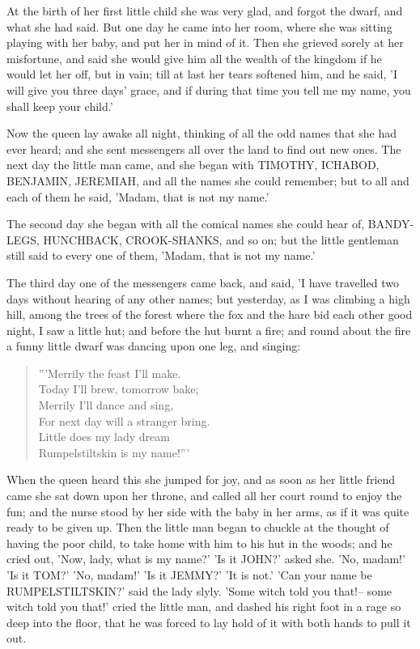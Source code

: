 \documentclass[12pt]{book}
\begin{document}
At the birth of her first little child she was very glad, and forgot
the dwarf, and what she had said. But one day he came into her room,
where she was sitting playing with her baby, and put her in mind of
it. Then she grieved sorely at her misfortune, and said she would give
him all the wealth of the kingdom if he would let her off, but in
vain; till at last her tears softened him, and he said, 'I will give
you three days' grace, and if during that time you tell me my name,
you shall keep your child.'

Now the queen lay awake all night, thinking of all the odd names that
she had ever heard; and she sent messengers all over the land to find
out new ones. The next day the little man came, and she began with
TIMOTHY, ICHABOD, BENJAMIN, JEREMIAH, and all the names she could
remember; but to all and each of them he said, 'Madam, that is not my
name.'

The second day she began with all the comical names she could hear of,
BANDY-LEGS, HUNCHBACK, CROOK-SHANKS, and so on; but the little
gentleman still said to every one of them, 'Madam, that is not my
name.'

The third day one of the messengers came back, and said, 'I have
travelled two days without hearing of any other names; but yesterday,
as I was climbing a high hill, among the trees of the forest where the
fox and the hare bid each other good night, I saw a little hut; and
before the hut burnt a fire; and round about the fire a funny little
dwarf was dancing upon one leg, and singing:

\begin{verse}
 '''Merrily the feast I'll make.\\
  Today I'll brew, tomorrow bake;\\
  Merrily I'll dance and sing,\\
  For next day will a stranger bring.\\
  Little does my lady dream\\
  Rumpelstiltskin is my name!'''
\end{verse}

When the queen heard this she jumped for joy, and as soon as her
little friend came she sat down upon her throne, and called all her
court round to enjoy the fun; and the nurse stood by her side with the
baby in her arms, as if it was quite ready to be given up. Then the
little man began to chuckle at the thought of having the poor child,
to take home with him to his hut in the woods; and he cried out, 'Now,
lady, what is my name?' 'Is it JOHN?' asked she. 'No, madam!' 'Is it
TOM?' 'No, madam!' 'Is it JEMMY?' 'It is not.' 'Can your name be
RUMPELSTILTSKIN?' said the lady slyly. 'Some witch told you that!--
some witch told you that!' cried the little man, and dashed his right
foot in a rage so deep into the floor, that he was forced to lay hold
of it with both hands to pull it out.
\end{document}
